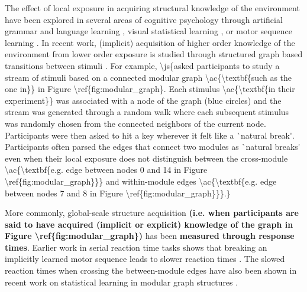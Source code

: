 The effect of local exposure in acquiring structural knowledge of the environment have been explored in several areas of cognitive psychology through artificial grammar and language learning \parencite{knowlton1992intact, romberg2010statistical, aslin2012statistical, dehaene2015neural}, visual statistical learning \parencite{fiser2002statistical, turk2008multidimensional, brady2008statistical}, or motor sequence learning \parencite{baldwin2008segmenting, nissen1987attentional, cleeremans1991learning, kahn2018network}. In recent work, (implicit) acquisition of higher order knowledge of the environment from lower order exposure is studied through structured graph based transitions between stimuli \parencite{schapiro2013neural, karuza2017process, kahn2018network, lynn2020humans, lynn2020human, karuza2022value}. For example, \cite{schapiro2013neural} \ac{\js{asked participants to study a stream of stimuli based on a connected modular graph \ac{\textbf{such as the one in}} in Figure \ref{fig:modular_graph}. Each stimulus \ac{\textbf{in their experiment}} was associated with a node of the graph (blue circles) and the stream was generated through a random walk where each subsequent stimulus was randomly chosen from the connected neighbors of the current node. Participants were then asked to hit a key wherever it felt like a `natural break'. Participants often parsed the edges that connect two modules as `natural breaks' even when their local exposure does not distinguish between the cross-module \ac{\textbf{e.g. edge between nodes 0 and 14 in Figure \ref{fig:modular_graph}}} and within-module edges \ac{\textbf{e.g. edge between nodes 7 and 8 in Figure \ref{fig:modular_graph}}}.}} 

More commonly, global-scale structure acquisition \textbf{\ac{(i.e. when participants are said to have acquired (implicit or explicit) knowledge of the graph in Figure \ref{fig:modular_graph})}} has been \textbf{\ac{measured through response times}}. Earlier work in serial reaction time tasks shows that breaking an implicitly learned motor sequence leads to slower reaction times \parencite{nissen1987attentional, cleeremans1991learning}. The slowed reaction times when crossing the between-module edges have also been shown in recent work on statistical learning in modular graph structures \parencite{kahn2018network, lynn2020humans, karuza2017process, karuza2022value, karuza2019human, lynn2020human}. 

